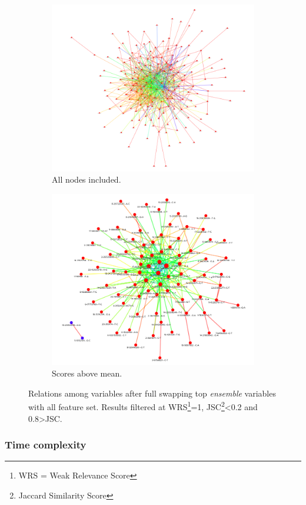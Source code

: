 \begin{figure}[!hp]
	\centering
	\captionsetup{justification=centering}
	\begin{subfigure}[b]{0.45\linewidth}
		\includegraphics[width=\linewidth]{Major Thesis/figures/graphs/dt2_ssc0.2_0.8ssc.png}
		\caption{All nodes included.}
	\end{subfigure}
	\hfill
	\begin{subfigure}[b]{0.45\linewidth}
		\includegraphics[width=\linewidth]{Major Thesis/figures/graphs/dt2_ssc0.2_0.8ssc_mean.png}
		\caption{Scores above mean.}
	\end{subfigure}
	\caption{Relations among variables after full swapping top \emph{ensemble} variables with all feature set. Results filtered at WRS\footnote{WRS = Weak Relevance Score}=1, JSC\footnote{Jaccard Similarity Score}<0.2 and 0.8>JSC.}
    \label{fig:dt2-trimmed}
\end{figure}

\subsubsection{Time complexity}